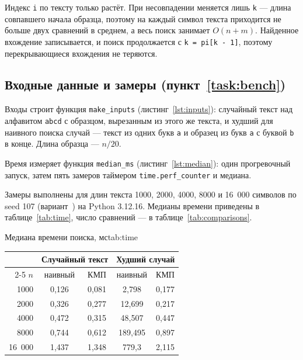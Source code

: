 Индекс \texttt{i} по тексту только растёт. При несовпадении меняется лишь \texttt{k} — длина
совпавшего начала образца, поэтому на каждый символ текста приходится не больше двух
сравнений в среднем, а весь поиск занимает $O(n + m)$. Найденное вхождение записывается, и
поиск продолжается с \texttt{k = pi[k - 1]}, поэтому перекрывающиеся вхождения не теряются.

\subsection{Входные данные и замеры (пункт~\ref{task:bench})}
Входы строит функция \texttt{make\_inputs} (листинг~\ref{lst:inputs}): случайный текст над
алфавитом \texttt{abcd} с образцом, вырезанным из этого же текста, и худший для наивного
поиска случай — текст из одних букв \texttt{a} и образец из букв \texttt{a} с буквой
\texttt{b} в конце. Длина образца — $n / 20$.


Время измеряет функция \texttt{median\_ms} (листинг~\ref{lst:median}): один прогревочный
запуск, затем пять замеров таймером \texttt{time.perf\_counter} и медиана.


Замеры выполнены для длин текста 1000, 2000, 4000, 8000 и 16~000 символов по seed 107
(вариант~\bbtVariant) на Python 3.12.16. Медианы времени приведены в таблице~\ref{tab:time}, число
сравнений — в таблице~\ref{tab:comparisons}.

\begin{bbttable}{Медиана времени поиска, мс}{tab:time}
  \begin{tabular}{|r|c|c|c|c|}
    \hline
    & \multicolumn{2}{c|}{Случайный текст} & \multicolumn{2}{c|}{Худший случай} \\ \cline{2-5}
    $n$ & наивный & КМП & наивный & КМП \\ \hline
    1000    & 0,126 & 0,081 & 2,798   & 0,177 \\ \hline
    2000    & 0,326 & 0,277 & 12,699  & 0,217 \\ \hline
    4000    & 0,472 & 0,315 & 48,507  & 0,447 \\ \hline
    8000    & 0,744 & 0,612 & 189,495 & 0,897 \\ \hline
    16~000  & 1,437 & 1,348 & 779,3   & 2,115 \\ \hline
  \end{tabular}
\end{bbttable}

